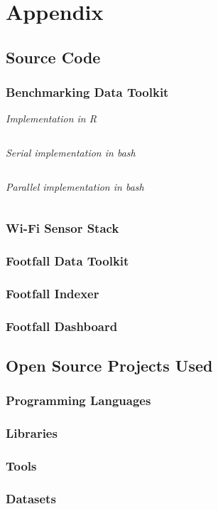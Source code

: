 \chapter{Appendix}

\section{Source Code}

  \subsection{Benchmarking Data Toolkit} \label{appendix:benchmark}
    \vspace{1.5em}\noindent\textit{Implementation in R}\vspace{0.5em}
    \inputminted{R}{analysis/data-toolkit/old-toolkit.r}
    \vspace{1.5em}\noindent\textit{Serial implementation in bash}\vspace{0.5em}
    \inputminted{bash}{analysis/data-toolkit/new-toolkit.sh}
    \vspace{1.5em}\noindent\textit{Parallel implementation in bash}\vspace{0.5em}
    \inputminted{bash}{analysis/data-toolkit/new-toolkit-parallel.sh}

  \subsection{Wi-Fi Sensor Stack}
  \subsection{Footfall Data Toolkit}
  \subsection{Footfall Indexer}
  \subsection{Footfall Dashboard}
\section{Open Source Projects Used}
  \subsection{Programming Languages}
  \subsection{Libraries}
  \subsection{Tools}
  \subsection{Datasets}

\backmatter


\printindex 

